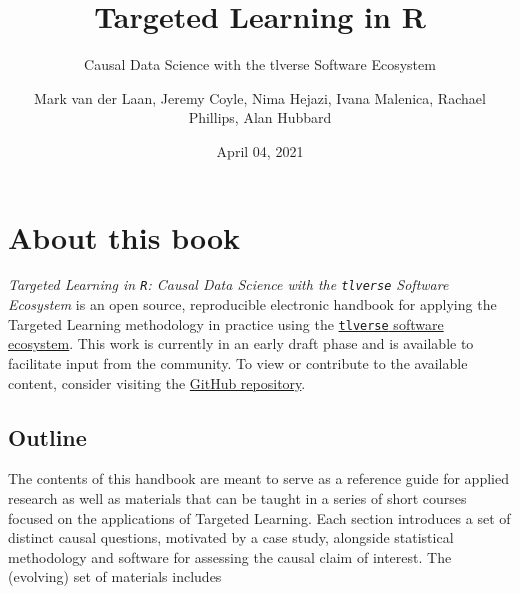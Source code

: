 \documentclass[12pt, krantz2,]{book}
\title{Targeted Learning in R}
\subtitle{Causal Data Science with the tlverse Software Ecosystem}
\author{Mark van der Laan, Jeremy Coyle, Nima Hejazi, Ivana Malenica, Rachael Phillips, Alan Hubbard}
\date{April 04, 2021}
\theoremstyle{definition}
\theoremstyle{definition}
\theoremstyle{definition}
\newcommand{\1}{\mathbbm{1}}
\begin{document}
\maketitle


\thispagestyle{empty}

\begin{center}

\end{center}

\setlength{\abovedisplayskip}{-5pt}
\setlength{\abovedisplayshortskip}{-5pt}

{
\hypersetup{linkcolor=}
\setcounter{tocdepth}{1}
\tableofcontents
}
\listoftables
\listoffigures
\hypertarget{about-this-book}{%
\chapter*{About this book}\label{about-this-book}}


\emph{Targeted Learning in \texttt{R}: Causal Data Science with the \texttt{tlverse} Software
Ecosystem} is an open source, reproducible electronic handbook for applying the
Targeted Learning methodology in practice using the \href{https://github.com/tlverse}{\texttt{tlverse} software
ecosystem}. This work is currently in an early draft
phase and is available to facilitate input from the community. To view or
contribute to the available content, consider visiting the \href{https://github.com/tlverse/tlverse-handbook}{GitHub
repository}.

\hypertarget{outline}{%
\section{Outline}\label{outline}}

The contents of this handbook are meant to serve as a reference guide for
applied research as well as materials that can be taught in a series of short
courses focused on the applications of Targeted Learning. Each section
introduces a set of distinct causal questions, motivated by a case study,
alongside statistical methodology and software for assessing the causal claim of
interest. The (evolving) set of materials includes
\end{document}
